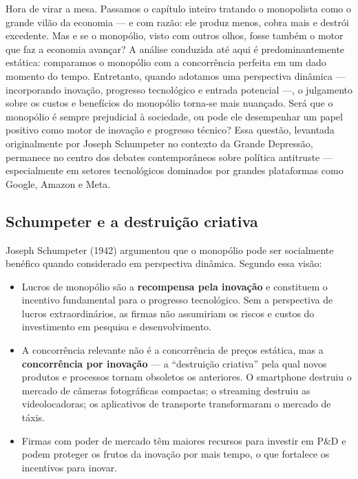 \documentclass[11pt,twoside,openright]{book}
\providecommand{\tightlist}{\setlength{\itemsep}{0pt}\setlength{\parskip}{0pt}}
\begin{document}
Hora de virar a mesa. Passamos o capítulo inteiro tratando o monopolista
como o grande vilão da economia --- e com razão: ele produz menos, cobra
mais e destrói excedente. Mas e se o monopólio, visto com outros olhos,
fosse também o motor que faz a economia avançar? A análise conduzida até
aqui é predominantemente estática: comparamos o monopólio com a
concorrência perfeita em um dado momento do tempo. Entretanto, quando
adotamos uma perspectiva dinâmica --- incorporando inovação, progresso
tecnológico e entrada potencial ---, o julgamento sobre os custos e
benefícios do monopólio torna-se mais nuançado. Será que o monopólio é
sempre prejudicial à sociedade, ou pode ele desempenhar um papel
positivo como motor de inovação e progresso técnico? Essa questão,
levantada originalmente por Joseph Schumpeter no contexto da Grande
Depressão, permanece no centro dos debates contemporâneos sobre política
antitruste --- especialmente em setores tecnológicos dominados por
grandes plataformas como Google, Amazon e Meta.

\subsection{Schumpeter e a destruição
criativa}\label{schumpeter-e-a-destruiuxe7uxe3o-criativa}

Joseph Schumpeter (1942) argumentou que o monopólio pode ser socialmente
benéfico quando considerado em perspectiva dinâmica. Segundo essa visão:

\begin{itemize}
\tightlist
\item
  Lucros de monopólio são a \textbf{recompensa pela inovação} e
  constituem o incentivo fundamental para o progresso tecnológico. Sem a
  perspectiva de lucros extraordinários, as firmas não assumiriam os
  riscos e custos do investimento em pesquisa e desenvolvimento.
\item
  A concorrência relevante não é a concorrência de preços estática, mas
  a \textbf{concorrência por inovação} --- a ``destruição criativa''
  pela qual novos produtos e processos tornam obsoletos os anteriores. O
  smartphone destruiu o mercado de câmeras fotográficas compactas; o
  streaming destruiu as videolocadoras; os aplicativos de transporte
  transformaram o mercado de táxis.
\item
  Firmas com poder de mercado têm maiores recursos para investir em P\&D
  e podem proteger os frutos da inovação por mais tempo, o que fortalece
  os incentivos para inovar.
\end{itemize}
\end{document}
